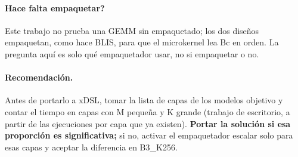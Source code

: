 \documentclass[10pt,a4paper]{article}
\newcommand{\key}[1]{\textbf{\textcolor{blue!55!black}{#1}}}  %
\begin{document}
\paragraph{\textquestiondown{}Hace falta empaquetar?} Este trabajo no prueba una GEMM sin empaquetado; los dos diseños empaquetan, como hace BLIS, para
que el microkernel lea Bc en orden. La pregunta aquí es solo qué empaquetador usar, no si empaquetar o no.

\paragraph{Recomendación.} Antes de portarlo a xDSL, tomar la lista de capas de los modelos objetivo y contar el tiempo en capas con
M pequeña y K grande (trabajo de escritorio, a partir de las ejecuciones por capa que ya existen). \key{Portar la solución si esa
proporción es significativa;} si no, activar el empaquetador escalar solo para esas capas y aceptar la diferencia en B3\_K256.
\end{document}
